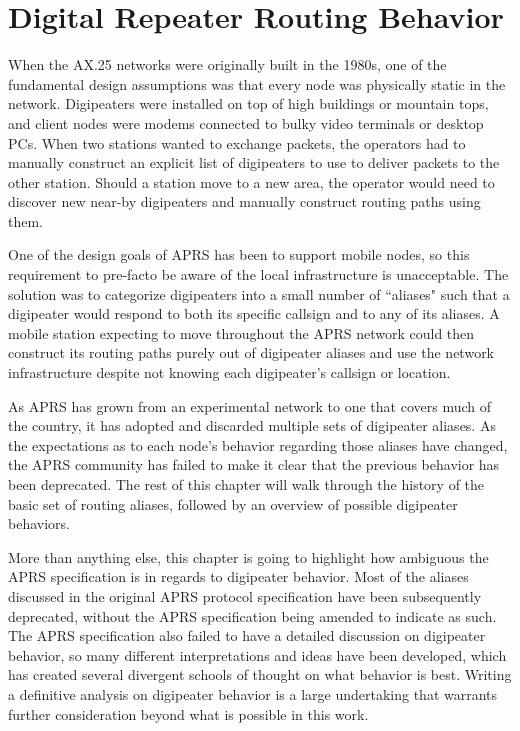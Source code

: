 \chapter{Digital Repeater Routing Behavior}

When the AX.25 networks were originally built in the 1980s,
one of the fundamental design assumptions was that every node was 
physically static in the network.
Digipeaters were installed on top of high buildings or mountain tops, 
and client nodes were modems connected to bulky video terminals or desktop PCs.
When two stations wanted to exchange packets,
the operators had to manually construct an explicit list of digipeaters to use
to deliver packets to the other station.
Should a station move to a new area, 
the operator would need to discover new near-by digipeaters and manually construct
routing paths using them.

One of the design goals of APRS has been to support mobile nodes,
so this requirement to pre-facto be aware of the
local infrastructure is unacceptable.
The solution was to categorize digipeaters into a small number of ``aliases"
such that a digipeater would respond to both its specific callsign
and to any of its aliases.
A mobile station expecting to move throughout the APRS network
could then construct its routing paths purely out of digipeater aliases
and use the network infrastructure despite not knowing
each digipeater's callsign or location.

As APRS has grown from an experimental network
to one that covers much of the country,
it has adopted and discarded multiple sets of digipeater aliases.
As the expectations as to each node's behavior regarding those aliases have changed,
the APRS community has failed to make it clear that
the previous behavior has been deprecated.
The rest of this chapter will walk through the history
of the basic set of routing aliases,
followed by an overview of possible digipeater behaviors.

More than anything else, this chapter is going to highlight
how ambiguous the APRS specification is in regards to digipeater behavior.
Most of the aliases discussed in the original APRS protocol specification
have been subsequently deprecated,
without the APRS specification being amended to indicate as such.
The APRS specification also failed to have a detailed discussion
on digipeater behavior,
so many different interpretations and ideas have been developed, which has
created several divergent schools of thought on what behavior is best.
Writing a definitive analysis on digipeater behavior is a large undertaking
that warrants further consideration beyond what is possible in this work.

